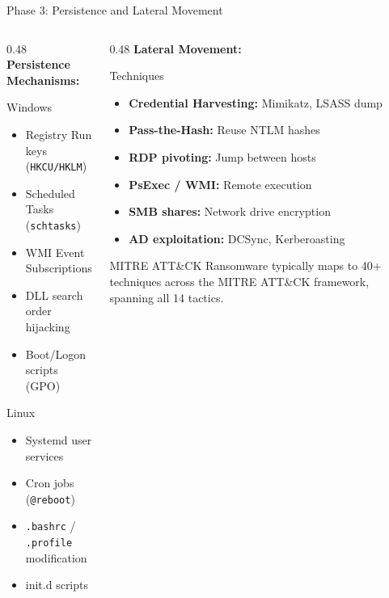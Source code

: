 \documentclass[aspectratio=169]{beamer}
\newcommand{\code}[1]{\texttt{\textcolor{primaryblue}{#1}}}
\begin{document}
\begin{frame}{Phase 3: Persistence and Lateral Movement}
  \begin{columns}[T]
    \begin{column}{0.48\textwidth}
      \textbf{Persistence Mechanisms:}
      \begin{block}{Windows}
        \footnotesize
        \begin{itemize}
          \item Registry Run keys (\code{HKCU/HKLM})
          \item Scheduled Tasks (\code{schtasks})
          \item WMI Event Subscriptions
          \item DLL search order hijacking
          \item Boot/Logon scripts (GPO)
        \end{itemize}
      \end{block}
      \begin{block}{Linux}
        \footnotesize
        \begin{itemize}
          \item Systemd user services
          \item Cron jobs (\code{@reboot})
          \item \code{.bashrc} / \code{.profile} modification
          \item init.d scripts
        \end{itemize}
      \end{block}
    \end{column}
    \begin{column}{0.48\textwidth}
      \textbf{Lateral Movement:}
      \begin{block}{Techniques}
        \footnotesize
        \begin{itemize}
          \item \textbf{Credential Harvesting:} Mimikatz, LSASS dump
          \item \textbf{Pass-the-Hash:} Reuse NTLM hashes
          \item \textbf{RDP pivoting:} Jump between hosts
          \item \textbf{PsExec / WMI:} Remote execution
          \item \textbf{SMB shares:} Network drive encryption
          \item \textbf{AD exploitation:} DCSync, Kerberoasting
        \end{itemize}
      \end{block}

      \vspace{0.3em}
      \begin{infobox}{MITRE ATT\&CK}
        Ransomware typically maps to 40+ techniques across the MITRE ATT\&CK framework, spanning all 14 tactics.
      \end{infobox}
    \end{column}
  \end{columns}
\end{frame}
\end{document}

